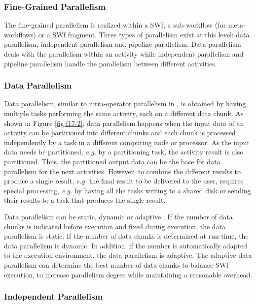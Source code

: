 \subsubsection{Fine-Grained Parallelism}

The fine-grained parallelism is realized within a SWf, a sub-workflow (for meta-workflows) or a SWf fragment. Three types of parallelism exist at this level: data parallelism, independent parallelism and pipeline parallelism.
Data parallelism deals with the parallelism within an activity while 
independent parallelism and pipeline parallelism
handle the parallelism between different activities.

\subsubsection*{Data Parallelism}

Data parallelism, similar to intra-operator parallelism in \cite{Ozsu2011}, is obtained by having
multiple tasks performing the same activity, each on a different data chunk.
As shown in Figure \ref{fig:f17-2}, data parallelism happens when the
input data of an activity can be partitioned into different chunks
and each chunk is processed independently by a task in a different computing node or
processor.
As the input data needs be partitioned, \textit{e.g.} by a partitioning task,
the activity result is also partitioned.
Thus, the partitioned output data can be the base for data
parallelism for the next activities.
However, to combine the different results to produce a single result,
\textit{e.g.} the final result to be delivered to the user,
requires special processing, \textit{e.g.} by having all the tasks writing
to a shared disk or sending
their results to a task that produces the single result.

Data parallelism can be static, dynamic or adaptive \cite{Pautasso2006}. 
If the number of data chunks is indicated before execution and fixed during execution, the data parallelism is static. If the number of data chunks is determined at run-time, the data parallelism is dynamic. In addition, if the number is automatically adapted to the execution environment, the data parallelism is adaptive. The adaptive data parallelism can determine the best number of data chunks to balance SWf execution, to increase parallelism degree while maintaining a reasonable overhead.

\subsubsection*{Independent Parallelism}

